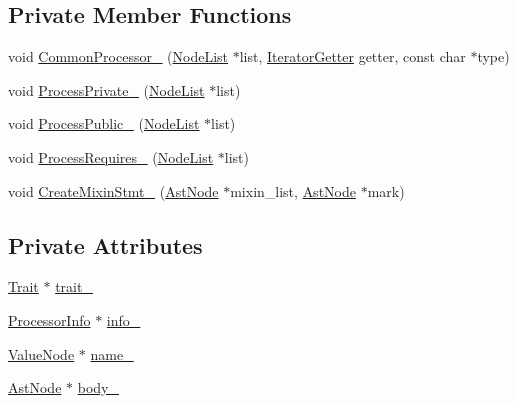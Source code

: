 \subsection*{Private Member Functions}
\begin{DoxyCompactItemize}
\item 
void \hyperlink{classmocha_1_1_trait_processor_a063e90b1e7ee7160a836ea7512b00154}{CommonProcessor\_\-} (\hyperlink{classmocha_1_1_node_list}{NodeList} $\ast$list, \hyperlink{classmocha_1_1_trait_processor_af7805e506418889e29cefb8f5c23c4a9}{IteratorGetter} getter, const char $\ast$type)
\item 
void \hyperlink{classmocha_1_1_trait_processor_af646d1fded29a7b4ed32db4d041682e9}{ProcessPrivate\_\-} (\hyperlink{classmocha_1_1_node_list}{NodeList} $\ast$list)
\item 
void \hyperlink{classmocha_1_1_trait_processor_af28b7da942c72a903f7a88151591603c}{ProcessPublic\_\-} (\hyperlink{classmocha_1_1_node_list}{NodeList} $\ast$list)
\item 
void \hyperlink{classmocha_1_1_trait_processor_a963012039e428372c18689d0f6f7b438}{ProcessRequires\_\-} (\hyperlink{classmocha_1_1_node_list}{NodeList} $\ast$list)
\item 
void \hyperlink{classmocha_1_1_trait_processor_a952d6c040be1e5429563b3752bff0d29}{CreateMixinStmt\_\-} (\hyperlink{classmocha_1_1_ast_node}{AstNode} $\ast$mixin\_\-list, \hyperlink{classmocha_1_1_ast_node}{AstNode} $\ast$mark)
\end{DoxyCompactItemize}
\subsection*{Private Attributes}
\begin{DoxyCompactItemize}
\item 
\hyperlink{classmocha_1_1_trait}{Trait} $\ast$ \hyperlink{classmocha_1_1_trait_processor_a8d94b8d55d770bec3d3b0b17cc626bf0}{trait\_\-}
\item 
\hyperlink{classmocha_1_1_processor_info}{ProcessorInfo} $\ast$ \hyperlink{classmocha_1_1_trait_processor_a90d1c88f5a7a093a2cfb2306e989769c}{info\_\-}
\item 
\hyperlink{classmocha_1_1_value_node}{ValueNode} $\ast$ \hyperlink{classmocha_1_1_trait_processor_ab927330496a78fef533aa1c5cb6eb745}{name\_\-}
\item 
\hyperlink{classmocha_1_1_ast_node}{AstNode} $\ast$ \hyperlink{classmocha_1_1_trait_processor_adee805716650a09bc1b81f79686e47fe}{body\_\-}
\end{DoxyCompactItemize}


